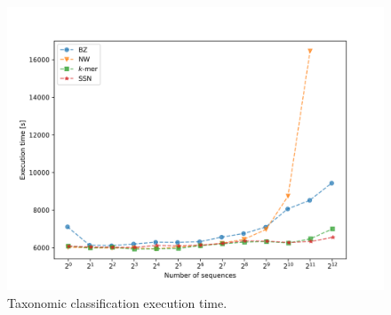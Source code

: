 \documentclass[pdflatex,sn-vancouver-num]{sn-jnl}%
\begin{document}
                \begin{figure}[!htb]
                    \begin{center}
                        \includegraphics[width=\textwidth]{picture_experiment_duration.png}
                    \end{center}
                    \caption{
                        Taxonomic classification execution time.
                    }\label{Picture:Experiment:Duration}
                \end{figure}
\end{document}
